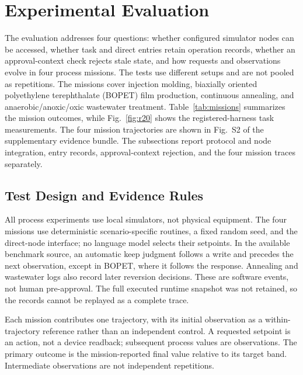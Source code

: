 \section{Experimental Evaluation}
\label{sec:eval}
The evaluation addresses four questions: whether configured simulator nodes
can be accessed, whether task and direct entries retain operation records,
whether an approval-context check rejects stale state, and how requests and
observations evolve in four process missions. The tests use different setups
and are not pooled as repetitions. The missions cover injection molding,
biaxially oriented polyethylene terephthalate (BOPET) film production,
continuous annealing, and anaerobic/anoxic/oxic wastewater treatment.
Table~\ref{tab:missions} summarizes the mission outcomes, while
Fig.~\ref{fig:r20} shows the registered-harness task measurements. The four
mission trajectories are shown in Fig.~S2 of the supplementary evidence bundle.
The subsections report protocol and node integration, entry records,
approval-context rejection, and the four mission traces separately.

\subsection{Test Design and Evidence Rules}
\label{sec:eval-protocol}
All process experiments use local simulators, not physical equipment. The
four missions use deterministic scenario-specific routines, a fixed random
seed, and the direct-node interface; no language model selects their setpoints.
In the available benchmark source, an automatic keep judgment follows a write
and precedes the next observation, except in BOPET, where it follows the
response. Annealing and wastewater logs also record later reversion decisions.
These are software events, not human pre-approval. The full executed runtime
snapshot was not retained, so the records cannot be replayed as a complete
trace.

Each mission contributes one trajectory, with its initial observation as a
within-trajectory reference rather than an independent control. A requested
setpoint is an action, not a device readback; subsequent process values are
observations. The primary outcome is the mission-reported final value relative
to its target band. Intermediate observations are not independent repetitions.

